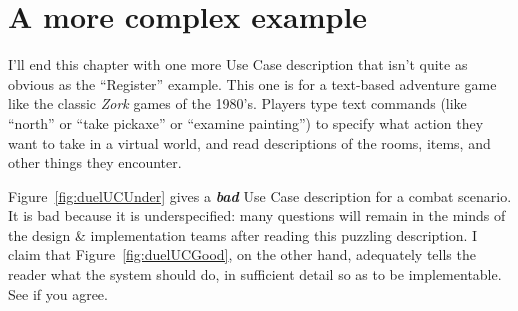 \section{A more complex example}

I'll end this chapter with one more Use Case description that isn't quite as
obvious as the ``Register'' example. This one is for a text-based adventure
game like the classic \textit{Zork} games of the 1980's. Players type text
commands (like ``north'' or ``take pickaxe'' or ``examine painting'') to
specify what action they want to take in a virtual world, and read
descriptions of the rooms, items, and other things they encounter.

\pagebreak
Figure~\ref{fig:duelUCUnder} gives a \textbf{\textit{bad}} Use Case
description for a combat scenario. It is bad because it is underspecified:
many questions will remain in the minds of the design \& implementation teams
after reading this puzzling description. I claim that
Figure~\ref{fig:duelUCGood}, on the other hand, adequately tells the reader
what the system should do, in sufficient detail so as to be implementable.
See if you agree.


